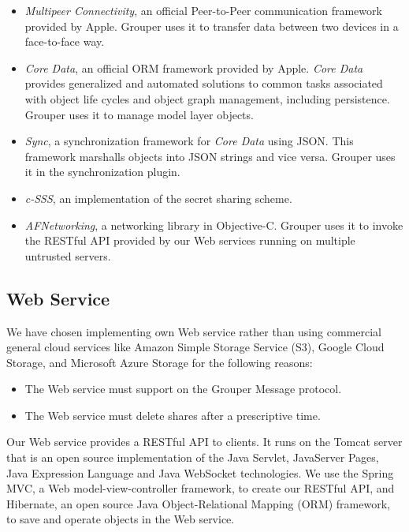 \documentclass[twocolumn,10pt]{article}
\begin{document}
\begin{itemize}
	\setlength{\itemsep}{1pt}
	\setlength{\parskip}{0pt}
	\setlength{\parsep}{0pt}
	\item 
	\emph{Multipeer Connectivity}\cite{mc},  an official Peer-to-Peer communication framework provided by Apple. 
	Grouper uses it to transfer data between two devices in a face-to-face way.
	\item 
	\emph{Core Data}\cite{coredata}, an official ORM framework provided by Apple.
	\emph{Core Data} provides generalized and automated solutions to common tasks associated with object life cycles and object graph management, including persistence. 
	Grouper uses it to manage model layer objects. 
	\item 
	\emph{Sync}\cite{sync}, a synchronization framework for \emph{Core Data} using JSON. 
	This framework marshalls objects into JSON strings and vice versa. 
	Grouper uses it in the synchronization plugin.
	\item 
	\emph{c-SSS}\cite{c-sss}, an implementation of the secret sharing scheme.
	\item 
	\emph{AFNetworking}\cite{afnetworking}, a networking library in Objective-C. 
	Grouper uses it to invoke the RESTful API provided by our Web services running on multiple untrusted servers. 
\end{itemize}

\subsection{Web Service}

We have chosen implementing own Web service rather than using commercial general cloud services like Amazon Simple Storage Service (S3), Google Cloud Storage, and Microsoft Azure Storage for the following reasons:

\begin{itemize}
	\setlength{\itemsep}{1pt}
	\setlength{\parskip}{0pt}
	\setlength{\parsep}{0pt}
	\item The Web service must support on the Grouper Message protocol.
	\item The Web service must delete shares after a prescriptive time.
\end{itemize}

Our Web service provides a RESTful API to clients.
It runs on the Tomcat server\cite{tomcat} that is an open source implementation of the Java Servlet, JavaServer Pages, Java Expression Language and Java WebSocket technologies. 
We use the Spring MVC\cite{spring}, a  Web model-view-controller framework, to create our RESTful API, and Hibernate\cite{hibernate}, an open source Java Object-Relational Mapping (ORM) framework, to save and operate objects in the Web service. 
\end{document}
